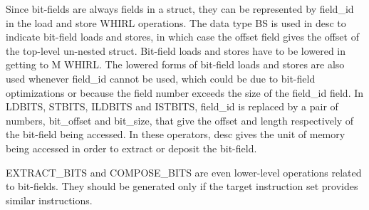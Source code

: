 \documentclass{article}
\begin{document}
Since bit-fields are always fields in a struct, they can be
represented by field\_id in the load and store WHIRL operations. The
data type BS is used in desc to indicate bit-field loads and stores, in which case
the offset field gives the offset of the top-level un-nested struct.
Bit-field loads and stores have to be lowered in getting to M WHIRL.
The lowered forms of bit-field loads and stores are also used whenever
field\_id cannot be used, which could be due to bit-field optimizations
or because the field number exceeds the size of the field\_id field.
In
%
LDBITS,
%
STBITS,
%
ILDBITS and
%
ISTBITS, field\_id is replaced by a pair
of numbers, bit\_offset and bit\_size, that give the offset and length
respectively of the
bit-field being accessed. In these operators, desc gives the unit
of memory being accessed in order to extract or deposit the
bit-field.

%
EXTRACT\_BITS and 
%
COMPOSE\_BITS are even lower-level operations
related to bit-fields. They should be generated only if the target
instruction set provides similar instructions. 
\end{document}
